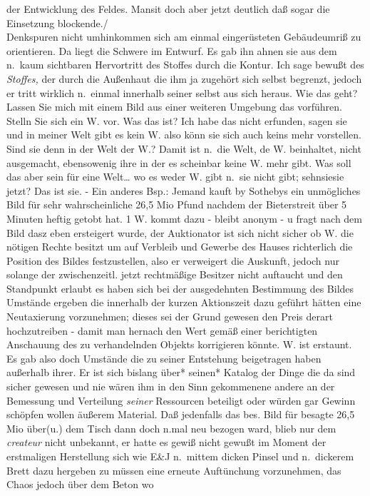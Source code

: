 \documentclass[
]{article}
\begin{document}
der Entwicklung des Feldes. Mansit doch aber jetzt deutlich daß sogar
die Einsetzung blockende./\\
Denkspuren nicht umhinkommen sich am einmal eingerüsteten Gebäudeumriß
zu orientieren. Da liegt die Schwere im Entwurf. Es gab ihn ahnen sie
aus dem n.~kaum sichtbaren Hervortritt des Stoffes durch die Kontur. Ich
sage bewußt des \emph{Stoffes,} der durch die Außenhaut die ihm ja
zugehört sich selbst begrenzt, jedoch er tritt wirklich n.~einmal
innerhalb seiner selbst aus sich heraus. Wie das geht? Lassen Sie mich
mit einem Bild aus einer weiteren Umgebung das vorführen. Stelln Sie
sich ein W. vor. Was das ist? Ich habe das nicht erfunden, sagen sie und
in meiner Welt gibt es kein W. also könn sie sich auch keins mehr
vorstellen. Sind sie denn in der Welt der W.? Damit ist n.~die Welt, de
W. beinhaltet, nicht ausgemacht, ebensowenig ihre in der es scheinbar
keine W. mehr gibt. Was soll das aber sein für eine Welt\ldots{} wo es
weder W. gibt n.~sie nicht gibt; sehnsiesie jetzt? Das ist sie. - Ein
anderes Bsp.: Jemand kauft by Sothebys ein unmögliches Bild für sehr
wahrscheinliche 26,5 Mio Pfund nachdem der Bieterstreit über 5 Minuten
heftig getobt hat. 1 W. kommt dazu - bleibt anonym - u fragt nach dem
Bild dasz eben ersteigert wurde, der Auktionator ist sich nicht sicher
ob W. die nötigen Rechte besitzt um auf Verbleib und Gewerbe des Hauses
richterlich die Position des Bildes festzustellen, also er verweigert
die Auskunft, jedoch nur solange der zwischenzeitl. jetzt rechtmäßige
Besitzer nicht auftaucht und den Standpunkt erlaubt es haben sich bei
der ausgedehnten Bestimmung des Bildes Umstände ergeben die innerhalb
der kurzen Aktionszeit dazu geführt hätten eine Neutaxierung
vorzunehmen; dieses sei der Grund gewesen den Preis derart hochzutreiben
- damit man hernach den Wert gemäß einer berichtigten Anschauung des zu
verhandelnden Objekts korrigieren könnte. W. ist erstaunt. Es gab also
doch Umstände die zu seiner Entstehung beigetragen haben außerhalb
ihrer. Er ist sich bislang über* seinen* Katalog der Dinge die da sind
sicher gewesen und nie wären ihm in den Sinn gekommenene andere an der
Bemessung und Verteilung \emph{seiner} Ressourcen beteiligt oder würden
gar Gewinn schöpfen wollen äußerem Material. Daß jedenfalls das bes.
Bild für besagte 26,5 Mio über(u.) dem Tisch dann doch n.mal neu bezogen
ward, blieb nur dem \emph{createur} nicht unbekannt, er hatte es gewiß
nicht gewußt im Moment der erstmaligen Herstellung sich wie E\&J
n.~mittem dicken Pinsel und n.~dickerem Brett dazu hergeben zu müssen
eine erneute Auftünchung vorzunehmen, das Chaos jedoch über dem Beton wo
\end{document}
